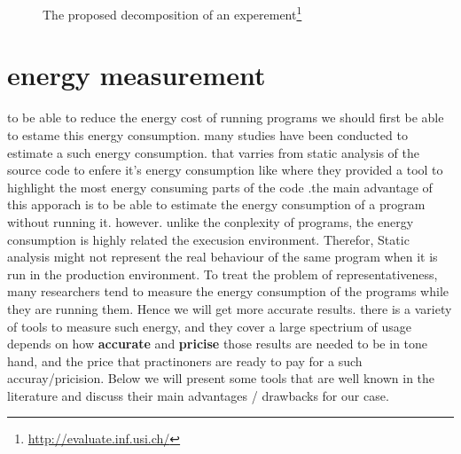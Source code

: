 



\begin{figure}[!hbt]
    \caption{The proposed decomposition of an experement\footnote{\url{http://evaluate.inf.usi.ch/}}}\label{fig:soa_expermiment component}
\end{figure}

\section{energy measurement}
to be able to reduce the energy cost of running programs we should first be able to estame this energy consumption.
many studies have been conducted to estimate a such energy consumption. that varries from static analysis of the source code to enfere it's energy consumption like \citeauthor{pereira_helping_2017} where they provided a tool to highlight the most energy consuming parts of the code \cite{pereira_helping_2017}.the main advantage of this apporach is to be able to estimate the energy consumption of a program without running it. however. unlike the conplexity of programs, the energy consumption is highly related the execusion environment. Therefor, Static analysis might not represent the real behaviour of the same program when it is run in the production environment.
To treat the problem of representativeness, many researchers tend to measure the energy consumption of the programs while they are running them. Hence we will get more accurate results.
there is a variety of tools to measure such energy, and they cover a large spectrium of usage depends on how \textbf{accurate} and \textbf{pricise} those results are needed to be in tone hand, and the price that practinoners are ready to pay for a such accuray/pricision.
Below we will present some tools that are well known in the literature and discuss their main advantages / drawbacks for our case.
